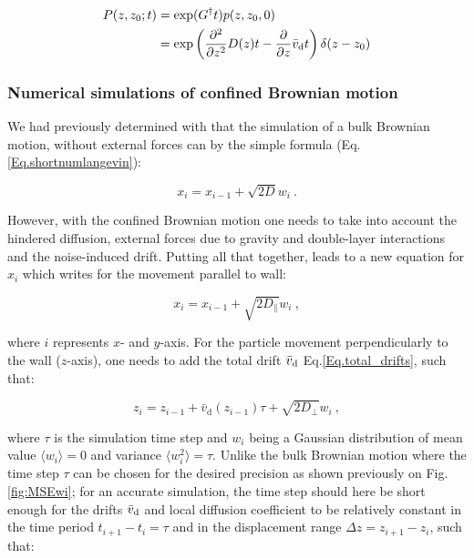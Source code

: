 \begin{equation}
	\begin{aligned}
		P(z, z_0; t) &= \exp (G^\dagger t) p(z, z_0, 0) \\
		& = \exp \left( \frac{\partial ^2}{\partial z ^2}  D(z)  t   -  \frac{\partial }{\partial z} \bar{v}_\textnormal{d} t\right) \delta (z - z_0)
	\end{aligned}
	\label{Eq.solfokker}
\end{equation} 

\subsubsection{Numerical simulations of confined Brownian motion}

We had previously determined with that the simulation of a bulk Brownian motion, without external forces can by the simple formula (Eq.\ref{Eq.shortnumlangevin}): 

\begin{equation}
	x_i = x_{i-1} + \sqrt{2D}w_i~.
\end{equation}

However, with the confined Brownian motion one needs to take into account the hindered diffusion, external forces due to gravity and double-layer interactions and the noise-induced drift. Putting all that together, leads to a new equation for $x_i$ which writes for the movement parallel to wall:

\begin{equation}
	x_i = x_{i-1} +  \sqrt{2D_\parallel}w_i ~,
\end{equation}

where $i$ represents $x$- and $y$-axis. For the particle movement perpendicularly to the wall ($z$-axis), one needs to add the total drift $\bar{v}_\textnormal{d}$ Eq.\ref{Eq.total_drifts}, such that:

\begin{equation}
	z_i = z_{i-1} + \bar{v}_\mathrm{d}(z_{i-1}) \tau + \sqrt{2D_\bot}w_i ~,
\end{equation}

where $\tau$ is the simulation time step and $w_i$ being a Gaussian distribution of mean value $\langle w_i \rangle = 0$ and variance $\langle w_i ^2\rangle = \tau$. Unlike the bulk Brownian motion where the time step $\tau$ can be chosen for the desired precision as shown previously on Fig.\ref{fig:MSEwi}; for an accurate simulation, the time step should here be short enough for the drifts $\bar{v}_\textnormal{d}$ and local diffusion coefficient to be relatively constant in the time period $t_{i+1} - t_i = \tau$ and in the displacement range $\Delta z = z_{i+1} - z_i$, such that:

